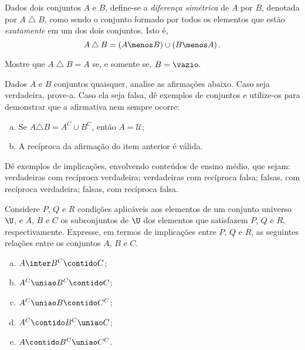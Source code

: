 \begin{exercise}
  Dados dois conjuntos $A$ e $B$, define-se a \emph{diferença simétrica} de $A$ por $B$, denotada por $A \bigtriangleup B$, como sendo o conjunto formado por todos os elementos que estão \emph{exatamente} em um dos dois conjuntos. Isto é,
$$A \bigtriangleup B = \left( A \menos B \right) \cup \left( B \menos A \right).$$

Mostre que $A \bigtriangleup B = A$ se, e somente se, $B = \vazio$.
\end{exercise}

\begin{exercise}
  Dados $A$ e $B$ conjuntos quaisquer, analise as afirmações abaixo. Caso seja verdadeira, prove-a. Caso ela seja falsa, dê exemplos de conjuntos e utilize-os para demonstrar que a afirmativa nem sempre ocorre:

  \begin{enumerate}[a)]
    \item Se $A \triangle B = A^C \cup B^C$, então $A = \mathcal U$;
    \item A recíproca da afirmação do item anterior é válida.
  \end{enumerate}
\end{exercise}

\begin{exercise}
  Dê exemplos de implicações, envolvendo conteúdos de ensino médio, que sejam: verdadeiras com recíproca verdadeira; verdadeiras com recíproca falsa; falsas, com recíproca verdadeira; falsas, com recíproca falsa.
\end{exercise}

\begin{exercise}
  Considere $P$, $Q$ e $R$ condições aplicáveis aos elementos de um conjunto universo $\U$, e $A$, $B$ e $C$ os subconjuntos de $\U$ dos elementos que satisfazem $P$, $Q$ e $R$, respectivamente. Expresse, em termos de implicações entre $P$, $Q$ e $R$, as seguintes relações entre os conjuntos $A$, $B$ e $C$.
  \begin{enumerate}[a)]
    \item $A \inter B^C \contido C$;
    \item $A^C \uniao B^C \contido C$;
    \item $A^C \uniao B \contido C^C$;
    \item $A^C \contido B^C \uniao C$;
    \item $A \contido B^C \uniao C^C$.
  \end{enumerate}
\end{exercise}

